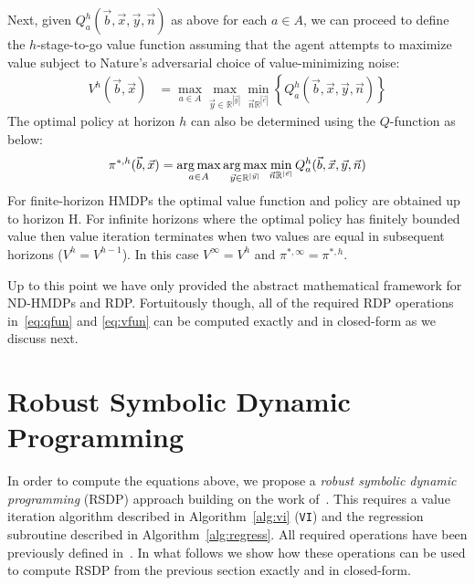 \documentclass[letterpaper]{article}
\def\argmax{\operatornamewithlimits{arg\,max}}
\begin{document}
Next, given $Q_a^h(\vec{b},\vec{x},\vec{y},\vec{n})$ as above for each
$a \in A$, we can proceed to define the $h$-stage-to-go value function
assuming that the agent attempts to maximize value subject to Nature's
adversarial choice of value-minimizing noise:
\vspace{-2mm}
{\footnotesize
\begin{align}
V^{h}(\vec{b},\vec{x}) & = \max_{a \in A} \max_{\vec{y} \in \mathbb{R}^{|\vec{y}|}} \min_{\vec{n} \mathbb{R}^{|\vec{e}|}} \left\{ Q^{h}_a(\vec{b},\vec{x},\vec{y},\vec{n}) \right\} \label{eq:vfun}
\end{align}}
The optimal policy at horizon $h$ can also be determined using the
$Q$-function as below:
{\footnotesize
\begin{align}
\pi^{*,h}(\vec{b},\vec{x}) = \argmax_{a \in A}  \argmax_{\vec{y} \in \mathbb{R}^{|\vec{y}|}}  \min_{\vec{n} \mathbb{R}^{|\vec{e}|}}  Q^h_a(\vec{b},\vec{x},\vec{y},\vec{n})
\end{align}}
For finite-horizon HMDPs the optimal value function and policy are
obtained up to horizon H.  For infinite horizons where the optimal policy
has finitely bounded value then value iteration terminates when two
values are equal in subsequent horizons ($V^{h} = V^{h-1}$). In this
case $V^\infty = V^h$ and $\pi^{*,\infty} = \pi^{*,h}$.
 
Up to this point we have only provided the abstract mathematical
framework for ND-HMDPs and RDP.  Fortuitously though, all of the
required RDP operations in~\eqref{eq:qfun} and \eqref{eq:vfun} can be
computed exactly and in closed-form as we discuss next.

\section{Robust Symbolic Dynamic Programming} 

In order to compute the equations above, we propose a \emph{robust
symbolic dynamic programming} (RSDP) approach building on the work
of~\cite{sdp_aaai,sanner_uai11}.  This requires a value iteration
algorithm described in Algorithm~\ref{alg:vi} (\texttt{VI}) and the
regression subroutine described in Algorithm~\ref{alg:regress}.  All
required operations have been previously defined
in~\cite{sdp_aaai,sanner_uai11}.  In what follows we show how these
operations can be used to compute RSDP from the previous section
exactly and in closed-form.
\end{document}
